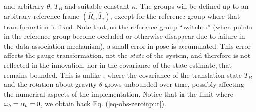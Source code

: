 and arbitrary $\theta$, $T_B$ and suitable constant $\kappa$. The groups will be defined up to an arbitrary reference frame $(\bar R_i, \bar T_i)$, except for the reference group where that transformation is fixed. 
Note that, as the reference group ``switches'' (when points in the reference group become occluded or otherwise disappear due to failure in the data association mechanism), a small error in pose is accumulated. 
This error affects the gauge transformation, not the {\em state} of the system, and therefore is not reflected in the innovation, nor in the covariance of the state estimate, that remains bounded. 
This is unlike \cite{roumeliotis2002augmenting}, where the covariance of the translation state $T_B$ and the rotation about gravity $\theta$ grows unbounded over time, possibly affecting the numerical aspects of the implementation. 
Notice that in the limit where $\dot {\omega}_b = \dot \alpha_b =0$, we obtain back Eq. (\ref{eq-obs-zeroinput}).